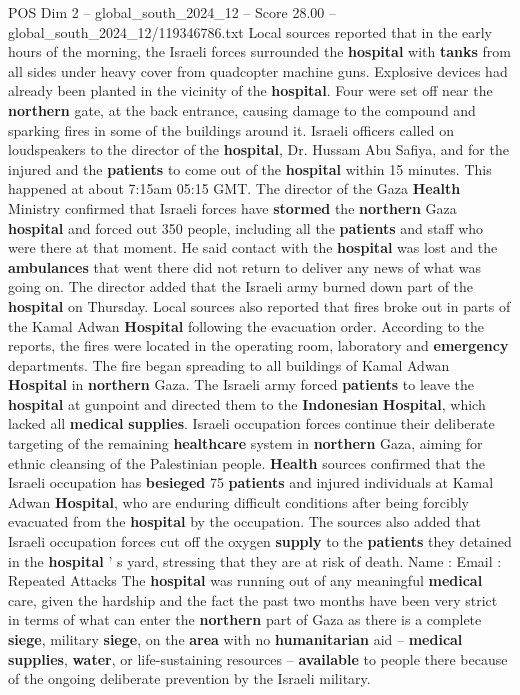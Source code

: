 \begin{textsample}{POS Dim 2 – global\_south\_2024\_12 – Score 28.00 – global\_south\_2024\_12/119346786.txt}  \label{ex:f2_pos_064}
Local sources reported that in the early hours of the morning, the Israeli forces surrounded the \textbf{hospital} with \textbf{tanks} from all sides under heavy cover from quadcopter machine guns.
Explosive devices had already been planted in the vicinity of the \textbf{hospital}.
Four were set off near the \textbf{northern} gate, at the back entrance, causing damage to the compound and sparking fires in some of the buildings around it.
Israeli officers called on loudspeakers to the director of the \textbf{hospital}, Dr.
Hussam Abu Safiya, and for the injured and the \textbf{patients} to come out of the \textbf{hospital} within 15 minutes.
This happened at about 7:15am 05:15 GMT.
The director of the Gaza \textbf{Health} Ministry confirmed that Israeli forces have \textbf{stormed} the \textbf{northern} Gaza \textbf{hospital} and forced out 350 people, including all the \textbf{patients} and staff who were there at that moment.
He said contact with the \textbf{hospital} was lost and the \textbf{ambulances} that went there did not return to deliver any news of what was going on.
The director added that the Israeli army burned down part of the \textbf{hospital} on Thursday.
Local sources also reported that fires broke out in parts of the Kamal Adwan \textbf{Hospital} following the evacuation order.
According to the reports, the fires were located in the operating room, laboratory and \textbf{emergency} departments.
The fire began spreading to all buildings of Kamal Adwan \textbf{Hospital} in \textbf{northern} Gaza.
The Israeli army forced \textbf{patients} to leave the \textbf{hospital} at gunpoint and directed them to the \textbf{Indonesian} \textbf{Hospital}, which lacked all \textbf{medical} \textbf{supplies}.
Israeli occupation forces continue their deliberate targeting of the remaining \textbf{healthcare} system in \textbf{northern} Gaza, aiming for ethnic cleansing of the Palestinian people. \textbf{Health} sources confirmed that the Israeli occupation has \textbf{besieged} 75 \textbf{patients} and injured individuals at Kamal Adwan \textbf{Hospital}, who are enduring difficult conditions after being forcibly evacuated from the \textbf{hospital} by the occupation.
The sources also added that Israeli occupation forces cut off the oxygen \textbf{supply} to the \textbf{patients} they detained in the \textbf{hospital} ' s yard, stressing that they are at risk of death.
Name : Email : Repeated Attacks The \textbf{hospital} was running out of any meaningful \textbf{medical} care, given the hardship and the fact the past two months have been very strict in terms of what can enter the \textbf{northern} part of Gaza as there is a complete \textbf{siege}, military \textbf{siege}, on the \textbf{area} with no \textbf{humanitarian} aid -- \textbf{medical} \textbf{supplies}, \textbf{water}, or life-sustaining resources -- \textbf{available} to people there because of the ongoing deliberate prevention by the Israeli military.

\end{textsample}
